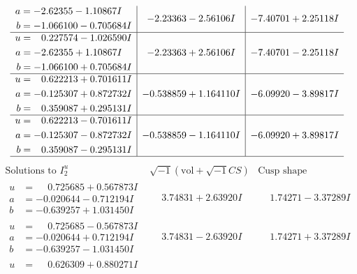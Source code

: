 \documentclass[1p]{elsarticle_modified}
\theoremstyle{definition}
\newcommand{\I}{\sqrt{-1}}
\begin{document}
$$\begin{array}{c|c|c}
\begin{aligned}
a &= -2.62355 - 1.10867 I \\
b &= -1.066100 - 0.705684 I\end{aligned}
 & -2.23363 - 2.56106 I & -7.40701 + 2.25118 I \\ \hline\begin{aligned}
u &= \phantom{-}0.227574 - 1.026590 I \\
a &= -2.62355 + 1.10867 I \\
b &= -1.066100 + 0.705684 I\end{aligned}
 & -2.23363 + 2.56106 I & -7.40701 - 2.25118 I \\ \hline\begin{aligned}
u &= \phantom{-}0.622213 + 0.701611 I \\
a &= -0.125307 + 0.872732 I \\
b &= \phantom{-}0.359087 + 0.295131 I\end{aligned}
 & -0.538859 + 1.164110 I & -6.09920 - 3.89817 I \\ \hline\begin{aligned}
u &= \phantom{-}0.622213 - 0.701611 I \\
a &= -0.125307 - 0.872732 I \\
b &= \phantom{-}0.359087 - 0.295131 I\end{aligned}
 & -0.538859 - 1.164110 I & -6.09920 + 3.89817 I\\
 \hline 
 \end{array}$$\newpage$$\begin{array}{c|c|c}  
\text{Solutions to }I^u_{2}& \I (\text{vol} + \sqrt{-1}CS) & \text{Cusp shape}\\
 \hline 
\begin{aligned}
u &= \phantom{-}0.725685 + 0.567873 I \\
a &= -0.020644 - 0.712194 I \\
b &= -0.639257 + 1.031450 I\end{aligned}
 & \phantom{-}3.74831 + 2.63920 I & \phantom{-}1.74271 - 3.37289 I \\ \hline\begin{aligned}
u &= \phantom{-}0.725685 - 0.567873 I \\
a &= -0.020644 + 0.712194 I \\
b &= -0.639257 - 1.031450 I\end{aligned}
 & \phantom{-}3.74831 - 2.63920 I & \phantom{-}1.74271 + 3.37289 I \\ \hline\begin{aligned}
u &= \phantom{-}0.626309 + 0.880271 I \\

\end{aligned}
\end{array}$$
\end{document}
